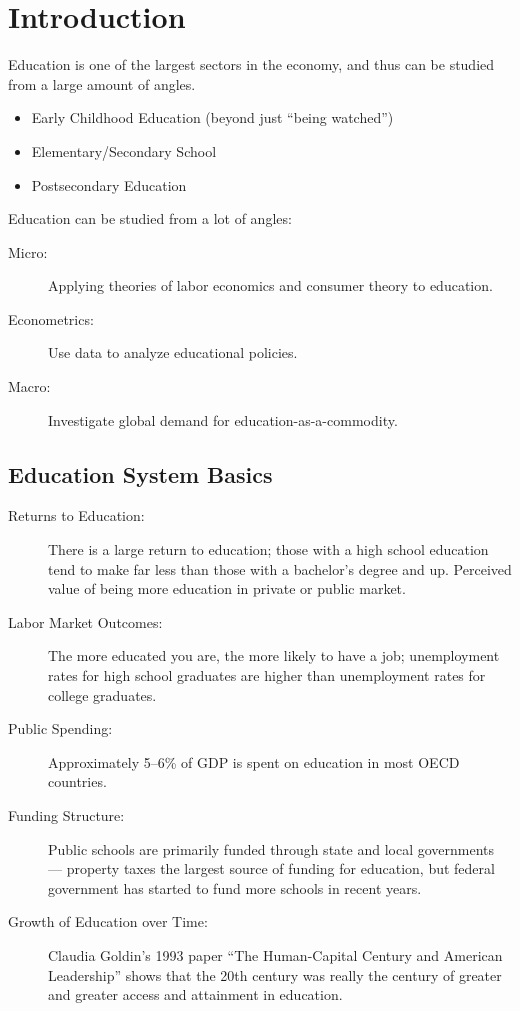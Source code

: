 \documentclass[10pt]{extarticle}
\title{}
\author{}
\date{}
\begin{document}
\section{Introduction}%
Education is one of the largest sectors in the economy, and thus can be studied from a large amount of angles.
\begin{itemize}
  \item Early Childhood Education (beyond just ``being watched'')
  \item Elementary/Secondary School
  \item Postsecondary Education
\end{itemize}
Education can be studied from a lot of angles:
\begin{description}
  \item[Micro:] Applying theories of labor economics and consumer theory to education.
  \item[Econometrics:] Use data to analyze educational policies.
  \item[Macro:] Investigate global demand for education-as-a-commodity.
\end{description}
\subsection{Education System Basics}%
\begin{description}
  \item[Returns to Education:] There is a large return to education; those with a high school education tend to make far less than those with a bachelor's degree and up. Perceived value of being more education in private or public market.
  \item[Labor Market Outcomes:] The more educated you are, the more likely to have a job; unemployment rates for high school graduates are higher than unemployment rates for college graduates.
  \item[Public Spending:] Approximately 5--6\% of GDP is spent on education in most OECD countries.
  \item[Funding Structure:] Public schools are primarily funded through state and local governments --- property taxes the largest source of funding for education, but federal government has started to fund more schools in recent years.
  \item[Growth of Education over Time:] Claudia Goldin's 1993 paper ``The Human-Capital Century and American Leadership'' shows that the 20th century was really the century of greater and greater access and attainment in education.
\end{description}
\end{document}
